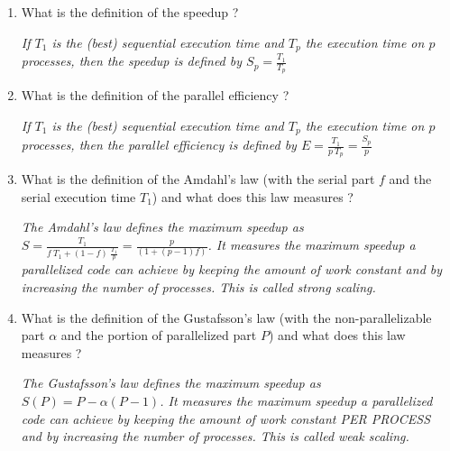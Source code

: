 \documentclass[11pt,a4paper]{article}
\begin{document}
\begin{exercise}
  $~$ %
\begin{enumerate}[label=(\alph*)]
	\item What is the definition of the speedup ?

{\it
	If $T_1$ is the (best) sequential execution time and $T_p$ the execution time on $p$ processes, then the speedup is defined by $S_p = \frac{T_1}{T_p}$
}


	\item What is the definition of the parallel efficiency ?

{\it
	If $T_1$ is the (best) sequential execution time and $T_p$ the execution time on $p$ processes, then the parallel efficiency is defined by $E = \frac{T_1}{p~T_p} = \frac{S_p}{p}$
}

	\item What is the definition of the Amdahl's law (with the serial part $f$ and the serial execution time $T_1$) and what does this law measures ?

{\it
	The Amdahl's law defines the maximum speedup as $S = \frac{T_1}{f~T_1 + (1-f)~\frac{T_1}{p}} = \frac{p}{(1 + (p-1) f)}$. It measures the maximum speedup a parallelized code can achieve by keeping the amount of work constant and by increasing the number of processes. This is called strong scaling.
}


	\item What is the definition of the Gustafsson's law (with the non-parallelizable part $\alpha$ and the portion of parallelized part $P$) and what does this law measures ?

{\it
	The Gustafsson's law defines the maximum speedup as $S(P) = P - \alpha (P-1)$. It measures the maximum speedup a parallelized code can achieve by keeping the amount of work constant PER PROCESS and by increasing the number of processes. This is called weak scaling.
}

\end{enumerate}
\end{exercise}
\end{document}
